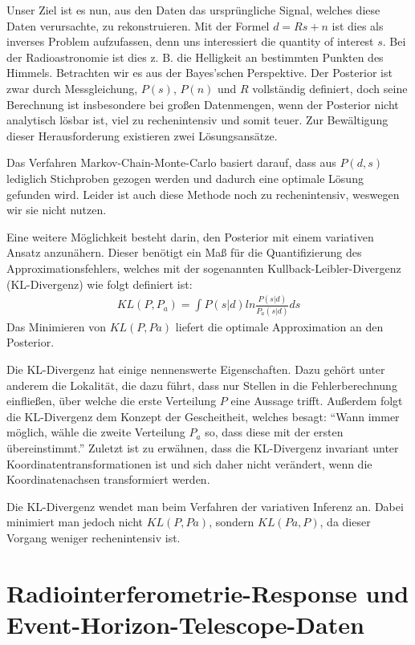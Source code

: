 \documentclass[]{dsadokumentation}
\begin{document}
Unser Ziel ist es nun, aus den Daten das ursprüngliche Signal, welches diese Daten verursachte, zu rekonstruieren. Mit der Formel $d=Rs+n$ ist dies als inverses Problem aufzufassen, denn uns interessiert die quantity of interest $s$. Bei der Radioastronomie ist dies z. B. die Helligkeit an bestimmten Punkten des Himmels. Betrachten wir es aus der Bayes'schen Perspektive. Der Posterior ist zwar durch Messgleichung, $P(s)$, $P(n)$ und $R$ vollständig definiert, doch seine Berechnung ist insbesondere bei großen Datenmengen, wenn der Posterior nicht analytisch lösbar ist, viel zu rechenintensiv und somit teuer. Zur Bewältigung dieser Herausforderung existieren zwei Lösungsansätze.

Das Verfahren Markov-Chain-Monte-Carlo basiert darauf, dass aus $P(d,s)$ lediglich Stichproben gezogen werden und dadurch eine optimale Lösung gefunden wird. Leider ist auch diese Methode noch zu rechenintensiv, weswegen wir sie nicht nutzen.

Eine weitere Möglichkeit besteht darin, den Posterior mit einem variativen Ansatz anzunähern. Dieser benötigt ein Maß für die Quantifizierung des Approximationsfehlers, welches mit der sogenannten Kullback-Leibler-Divergenz (KL-Divergenz) wie folgt definiert ist:
\begin{eqnarray}
KL(P,P_a) = \int P(s|d) ln \frac{P(s|d)}{P_a(s|d)}ds
\end{eqnarray}
Das Minimieren von $KL(P, Pa)$ liefert die optimale Approximation an den Posterior.

Die KL-Divergenz hat einige nennenswerte Eigenschaften. Dazu gehört unter anderem die Lokalität, die dazu führt, dass nur Stellen in die Fehlerberechnung einfließen, über welche die erste Verteilung $P$ eine Aussage trifft. Außerdem folgt die KL-Divergenz dem Konzept der Gescheitheit, welches besagt: \enquote{Wann immer möglich, wähle die zweite Verteilung $P_a$ so, dass diese mit der ersten übereinstimmt.} Zuletzt ist zu erwähnen, dass die KL-Divergenz invariant unter Koordinatentransformationen ist und sich daher nicht verändert, wenn die Koordinatenachsen transformiert werden.

Die KL-Divergenz wendet man beim Verfahren der variativen Inferenz an. Dabei minimiert man jedoch nicht $KL(P, Pa)$, sondern $KL(Pa, P)$, da dieser Vorgang weniger rechenintensiv ist.

\section{Radiointerferometrie-Response und Event-Horizon-Telescope-Daten}
\end{document}
